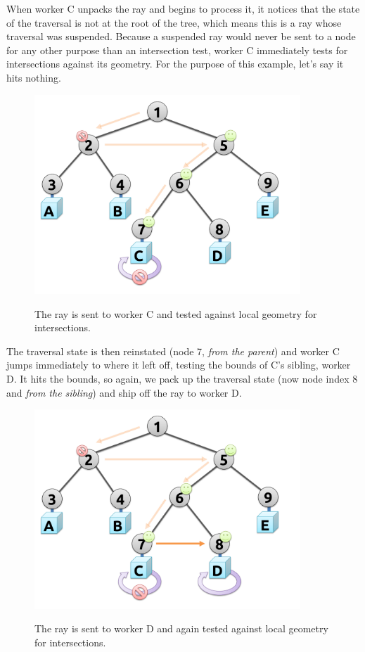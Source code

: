 \documentclass[12pt]{ucthesis}
\newcommand{\captionfonts}{\small\bf\ssp}
\begin{document}
When worker C unpacks the ray and begins to process it, it notices that the
state of the traversal is not at the root of the tree, which means this is a
ray whose traversal was suspended. Because a suspended ray would never be sent
to a node for any other purpose than an intersection test, worker C immediately
tests for intersections against its geometry. For the purpose of this example,
let's say it hits nothing.

\begin{figure}[H]
    \centering
    \includegraphics[width=100mm]{figures/traversal4.pdf}
    \captionfonts
    \caption{The ray is sent to worker C and tested against local geometry for intersections.}
    \label{fig:traversal4}
\end{figure}

The traversal state is then reinstated (node 7, \emph{from the parent}) and
worker C jumps immediately to where it left off, testing the bounds of C's
sibling, worker D. It hits the bounds, so again, we pack up the traversal
state (now node index 8 and \emph{from the sibling}) and ship off the ray to
worker D.

\begin{figure}[H]
    \centering
    \includegraphics[width=100mm]{figures/traversal5.pdf}
    \captionfonts
    \caption{The ray is sent to worker D and again tested against local geometry for intersections.}
    \label{fig:traversal5}
\end{figure}
\end{document}
